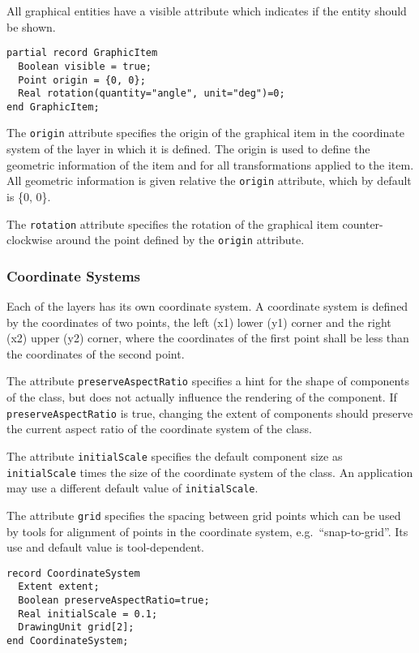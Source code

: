 All graphical entities have a visible attribute which indicates if the
entity should be shown.

\begin{lstlisting}[language=modelica]
partial record GraphicItem
  Boolean visible = true;
  Point origin = {0, 0};
  Real rotation(quantity="angle", unit="deg")=0;
end GraphicItem;
\end{lstlisting}
The \lstinline!origin! attribute specifies the origin of the graphical item in the
coordinate system of the layer in which it is defined. The origin is
used to define the geometric information of the item and for all
transformations applied to the item. All geometric information is given
relative the \lstinline!origin! attribute, which by default is \{0, 0\}.

The \lstinline!rotation! attribute specifies the rotation of the graphical item
counter-clockwise around the point defined by the \lstinline!origin! attribute.

\subsubsection{Coordinate Systems}\label{coordinate-systems}

Each of the layers has its own coordinate system. A coordinate system is
defined by the coordinates of two points, the left (x1) lower (y1)
corner and the right (x2) upper (y2) corner, where the coordinates of
the first point shall be less than the coordinates of the second point.

The attribute \lstinline!preserveAspectRatio! specifies a hint for the shape of
components of the class, but does not actually influence the rendering of the component.
If \lstinline!preserveAspectRatio! is true, changing the
extent of components should preserve the current aspect ratio of the coordinate
system of the class.

The attribute \lstinline!initialScale! specifies the default component size as
\lstinline!initialScale! times the size of the coordinate system of the class. An
application may use a different default value of \lstinline!initialScale!.

The attribute \lstinline!grid! specifies the spacing between grid points which can
be used by tools for alignment of points in the coordinate system, e.g.\ ``snap-to-grid''.
Its use and default value is tool-dependent.

\begin{lstlisting}[language=modelica]
record CoordinateSystem
  Extent extent;
  Boolean preserveAspectRatio=true;
  Real initialScale = 0.1;
  DrawingUnit grid[2];
end CoordinateSystem;
\end{lstlisting}

